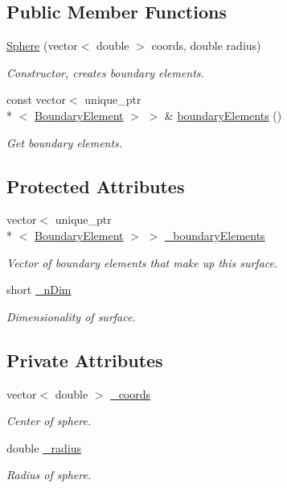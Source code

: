\subsection*{Public Member Functions}
\begin{DoxyCompactItemize}
\item 
\hyperlink{classSphere_a666bb65e4d9db394c6e91c3fa6d1cffb}{Sphere} (vector$<$ double $>$ coords, double radius)
\begin{DoxyCompactList}\small\item\em Constructor, creates boundary elements. \end{DoxyCompactList}\item 
const vector$<$ unique\+\_\+ptr\\*
$<$ \hyperlink{classBoundaryElement}{Boundary\+Element} $>$ $>$ \& \hyperlink{classBoundarySurface_a402dcf23f4f96110569d01e401edee5a}{boundary\+Elements} ()
\begin{DoxyCompactList}\small\item\em Get boundary elements. \end{DoxyCompactList}\end{DoxyCompactItemize}
\subsection*{Protected Attributes}
\begin{DoxyCompactItemize}
\item 
vector$<$ unique\+\_\+ptr\\*
$<$ \hyperlink{classBoundaryElement}{Boundary\+Element} $>$ $>$ \hyperlink{classBoundarySurface_a67f60b2d22fb67f097e98025803d3d34}{\+\_\+boundary\+Elements}
\begin{DoxyCompactList}\small\item\em Vector of boundary elements that make up this surface. \end{DoxyCompactList}\item 
short \hyperlink{classBoundarySurface_af3ed79310c6ba6cdc8e9f176bf463eb1}{\+\_\+n\+Dim}
\begin{DoxyCompactList}\small\item\em Dimensionality of surface. \end{DoxyCompactList}\end{DoxyCompactItemize}
\subsection*{Private Attributes}
\begin{DoxyCompactItemize}
\item 
vector$<$ double $>$ \hyperlink{classSphere_a68255c3822c940da2e423d17aaaf6190}{\+\_\+coords}
\begin{DoxyCompactList}\small\item\em Center of sphere. \end{DoxyCompactList}\item 
double \hyperlink{classSphere_a3e97d05676e0513fa6b01b419b071bc6}{\+\_\+radius}
\begin{DoxyCompactList}\small\item\em Radius of sphere. \end{DoxyCompactList}\end{DoxyCompactItemize}


